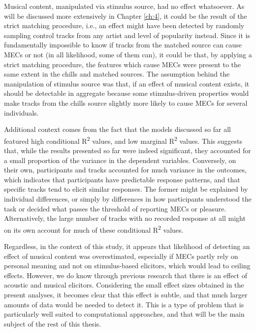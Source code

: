 Musical content, manipulated via stimulus source, had no effect whatsoever. As will be discussed more extensively in Chapter \ref{ch:4}, it could be the result of the strict matching procedure, i.e., an effect might have been detected by randomly sampling control tracks from any artist and level of popularity instead. Since it is fundamentally impossible to know if tracks from the matched source can cause MECs or not (in all likelihood, some of them can), it could be that, by applying a strict matching procedure, the features which cause MECs were present to the same extent in the chills and matched sources. The assumption behind the manipulation of stimulus source was that, if an effect of musical content exists, it should be detectable in aggregate because some stimulus-driven properties would make tracks from the chills source slightly more likely to cause MECs for several individuals.

Additional context comes from the fact that the models discussed so far all featured high conditional R\textsuperscript{2} values, and low marginal R\textsuperscript{2} values. This suggests that, while the results presented so far were indeed significant, they accounted for a small proportion of the variance in the dependent variables. Conversely, on their own, participants and tracks accounted for much variance in the outcomes, which indicates that participants have predictable response patterns, and that specific tracks tend to elicit similar responses. The former might be explained by individual differences, or simply by differences in how participants understood the task or decided what passes the threshold of reporting MECs or pleasure. Alternatively, the large number of tracks with no recorded response at all might on its own account for much of these conditional R\textsuperscript{2} values.

Regardless, in the context of this study, it appears that likelihood of detecting an effect of musical content was overestimated, especially if MECs partly rely on personal meaning and not on stimulus-based elicitors, which would lead to ceiling effects. However, we do know through previous research that there is an effect of acoustic and musical elicitors. Considering the small effect sizes obtained in the present analyses, it becomes clear that this effect is subtle, and that much larger amounts of data would be needed to detect it. This is a type of problem that is particularly well suited to computational approaches, and that will be the main subject of the rest of this thesis.

